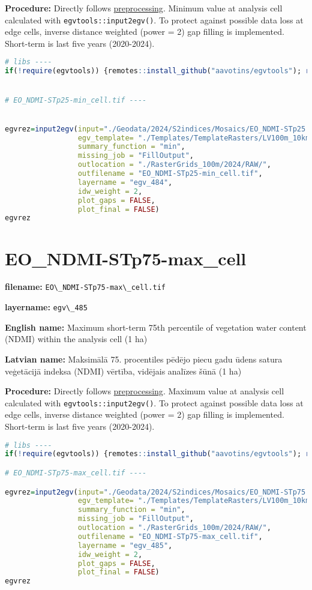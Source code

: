 \documentclass[
]{book}
\newcommand{\passthrough}[1]{#1}
\begin{document}
\textbf{Procedure:} Directly follows \hyperref[Ch04.13]{preprocessing}. Minimum value at analysis cell
calculated with \passthrough{\lstinline!egvtools::input2egv()!}. To protect against possible data loss at edge cells,
inverse distance weighted (power = 2) gap filling is implemented. Short-term is last five years (2020-2024).

\begin{lstlisting}[language=R]
# libs ----
if(!require(egvtools)) {remotes::install_github("aavotins/egvtools"); require(egvtools)}


# EO_NDMI-STp25-min_cell.tif ----


egvrez=input2egv(input="./Geodata/2024/S2indices/Mosaics/EO_NDMI-STp25.tif",
                 egv_template= "./Templates/TemplateRasters/LV100m_10km.tif",
                 summary_function = "min",
                 missing_job = "FillOutput",
                 outlocation = "./RasterGrids_100m/2024/RAW/",
                 outfilename = "EO_NDMI-STp25-min_cell.tif",
                 layername = "egv_484",
                 idw_weight = 2,
                 plot_gaps = FALSE,
                 plot_final = FALSE)
egvrez
\end{lstlisting}

\section{EO\_NDMI-STp75-max\_cell}\label{ch06.485}

\textbf{filename:} \passthrough{\lstinline!EO\_NDMI-STp75-max\_cell.tif!}

\textbf{layername:} \passthrough{\lstinline!egv\_485!}

\textbf{English name:} Maximum short-term 75th percentile of vegetation water content (NDMI) within the analysis cell (1 ha)

\textbf{Latvian name:} Maksimālā 75. procentiles pēdējo piecu gadu ūdens satura veģetācijā indeksa (NDMI) vērtība, vidējais analīzes šūnā (1 ha)

\textbf{Procedure:} Directly follows \hyperref[Ch04.13]{preprocessing}. Maximum value at analysis cell
calculated with \passthrough{\lstinline!egvtools::input2egv()!}. To protect against possible data loss at edge cells,
inverse distance weighted (power = 2) gap filling is implemented. Short-term is last five years (2020-2024).

\begin{lstlisting}[language=R]
# libs ----
if(!require(egvtools)) {remotes::install_github("aavotins/egvtools"); require(egvtools)}

# EO_NDMI-STp75-max_cell.tif ----

egvrez=input2egv(input="./Geodata/2024/S2indices/Mosaics/EO_NDMI-STp75.tif",
                 egv_template= "./Templates/TemplateRasters/LV100m_10km.tif",
                 summary_function = "min",
                 missing_job = "FillOutput",
                 outlocation = "./RasterGrids_100m/2024/RAW/",
                 outfilename = "EO_NDMI-STp75-max_cell.tif",
                 layername = "egv_485",
                 idw_weight = 2,
                 plot_gaps = FALSE,
                 plot_final = FALSE)
egvrez
\end{lstlisting}
\end{document}
